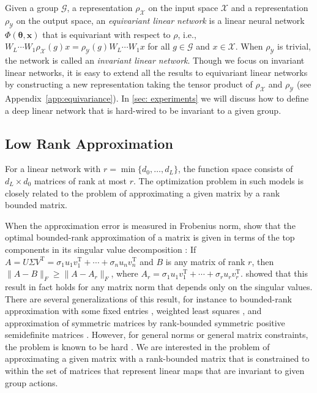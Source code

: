 \documentclass{article}
\newcommand{\T}{\mathrm{T}}
\newcommand{\G}{\mathcal{G}}
\newcommand{\X}{\mathcal{X}}
\newcommand{\Y}{\mathcal{Y}}
\theoremstyle{plain}
\theoremstyle{definition}
\theoremstyle{remark}
\theoremstyle{remark}
\begin{document}
Given a group $\G$, a representation $\rho_{\X}$ on the input space $\X$ and a representation $\rho_{\Y}$ on the output space, an \textit{equivariant linear network} is a linear neural network $\Phi(\boldsymbol{\theta}, \mathbf{x})$ that is equivariant with respect to $\rho$, i.e., $W_L \cdots W_1\rho_{\X}(g)x = \rho_{\Y}(g) W_L \cdots W_1x$ for all $g \in \G$ and $x \in \X$. 
When $\rho_{\Y}$ is trivial, the network is called an \textit{invariant linear network}. Though we focus on invariant linear networks, it is easy to extend all the results to equivariant linear networks by constructing a new representation taking the tensor product of $\rho_{\X}$ and $\rho_{\Y}$ (see Appendix~\ref{app:equivariance}). 
In \autoref{sec: experiments} we will discuss how to define a deep linear network that is hard-wired to be invariant to a given group.

\subsection{Low Rank Approximation} 
For a linear network with $r = \min\{d_0,\ldots, d_L\}$, the function space consists of $d_L \times d_0$ matrices of rank at most $r$. The optimization problem in such models is closely related to the problem of approximating a given matrix by a rank bounded matrix. 

When the approximation error is measured in Frobenius norm, \citet{Eckart1936approximation} show that the optimal bounded-rank approximation of a matrix is given in terms of the top components in its singular value decomposition \citep[see, e.g.,][I.9]{strang}:
If $A = U\Sigma V^\T=\sigma_1u_1v_1^\T+\cdots+\sigma_n u_nv_n^\T$ and $B$ is any matrix of rank $r$, then $\|A-B\|_F\geq \|A-A_r\|_F$, where $A_r =\sigma_1u_1v_1^\T+\cdots+\sigma_ru_rv_r^\T$. 
\citet{mirsky1960symmetric} showed that this result in fact holds for any matrix norm that depends only on the singular values. 
There are several generalizations of this result, for instance to bounded-rank approximation with some fixed entries \citep{golub1987generalization}, weighted least squares \citep{ruben1979lower,dutta2017problem}, and approximation of symmetric matrices by rank-bounded symmetric positive semidefinite matrices \citep{dax2014lowsymmetric}. 
However, for general norms or general matrix constraints, the problem is known to be hard \citep{zhao2017lowl1, gillis2017low}. We are interested in the problem of approximating a given matrix with a rank-bounded matrix that is constrained to within the set of matrices that represent linear maps that are invariant to given group actions. 
\end{document}
